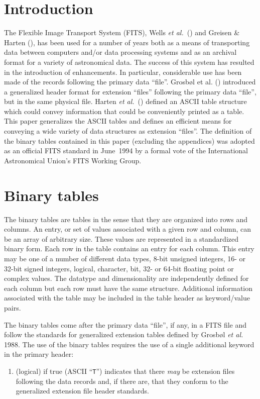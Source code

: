 \section{Introduction}

The Flexible Image Transport System (FITS), Wells {\em et
al.}~(\cite{paper1}) and Greisen \& Harten (\cite{paper2}), has been
used for a number of years both as a means of transporting data
between computers and/or data processing systems and as an archival format
for a variety of astronomical data.  The success of this system has
resulted in the introduction of enhancements.  In particular,
considerable use has been made of the records following the primary
data ``file''.  Grosb\o l et al. (\cite{paper3}) introduced a generalized
header format for extension ``files'' following the primary data
``file'', but in the same physical file.  Harten {\em et
al.}~(\cite{paper4}) defined an ASCII table structure which could
convey information that could be conveniently printed as a table.
This paper generalizes the ASCII tables and defines an efficient means
for conveying a wide variety of data structures as extension
``files''.  The definition of the binary tables contained in this paper
(excluding the appendices) was adopted as an official FITS standard in
June~1994 by a formal vote of the International Astronomical Union's
FITS Working Group.

\section {Binary tables}

The binary tables are tables in the sense that they are organized into
rows and columns.  An entry, or set
of values associated with a given row and column, can be an array of
arbitrary size.  These values are represented in a standardized binary
form.  Each row in the table contains an entry for each column.  This
entry may be one of a number of different data types, 8-bit unsigned
integers, 16- or 32-bit signed integers, logical, character, bit, 32-
or 64-bit floating point or complex values.  The datatype and
dimensionality are independently defined for each column but each row
must have the same structure.  Additional information associated with
the table may be included in the table header as keyword/value pairs.

The binary tables come after the primary data ``file'', if any, in a FITS
file and follow the standards for generalized extension tables defined
by Grosb\o l {\it et al.} 1988.  The use of the binary tables requires
the use of a single additional keyword in the primary header:
\begin{enumerate} %
\item {} (logical) if true (ASCII ``\verb|T|'') indicates
that there {\it may\/} be extension files following the data records
and, if there are, that they conform to the generalized extension file
header standards.
\end{enumerate} %

